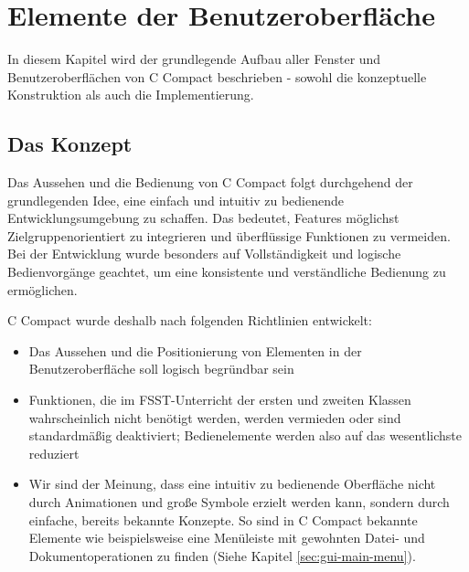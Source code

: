 

\chapter{Elemente der Benutzeroberfläche}
In diesem Kapitel wird der grundlegende Aufbau aller Fenster und Benutzeroberflächen von C Compact beschrieben - sowohl die konzeptuelle Konstruktion als auch die Implementierung.
\section{Das Konzept}
Das Aussehen und die Bedienung von C Compact folgt durchgehend der grundlegenden Idee, eine einfach und intuitiv zu bedienende Entwicklungsumgebung zu schaffen. Das bedeutet, Features möglichst Zielgruppenorientiert zu integrieren und überflüssige Funktionen zu vermeiden. Bei der Entwicklung wurde besonders auf Vollständigkeit und logische Bedienvorgänge geachtet, um eine konsistente und verständliche Bedienung zu ermöglichen.

C Compact wurde deshalb nach folgenden Richtlinien entwickelt:
\begin{itemize}
\item Das Aussehen und die Positionierung von Elementen in der Benutzeroberfläche soll logisch begründbar sein
\item Funktionen, die im FSST-Unterricht der ersten und zweiten Klassen wahrscheinlich nicht benötigt werden, werden vermieden oder sind standardmäßig deaktiviert; Bedienelemente werden also auf das wesentlichste reduziert
\item Wir sind der Meinung, dass eine intuitiv zu bedienende Oberfläche nicht durch Animationen und große Symbole erzielt werden kann, sondern durch einfache, bereits bekannte Konzepte. So sind in C Compact bekannte Elemente wie beispielsweise eine Menüleiste mit gewohnten Datei- und Dokumentoperationen zu finden (Siehe Kapitel \ref{sec:gui-main-menu}).
\end{itemize}

